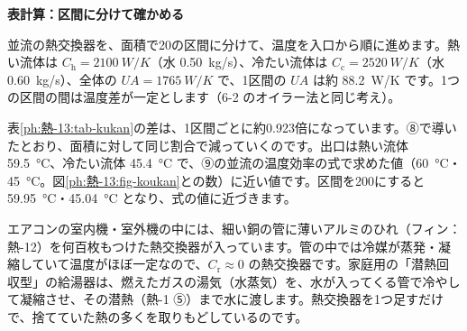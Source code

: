 \noindent\textbf{表計算：区間に分けて確かめる}\par\nobreak
並流の熱交換器を、面積で20の区間に分けて、温度を入口から順に進めます。熱い流体は $C_{\mathrm h}=\qty{2100}{W/K}$（水 \qty{0.50}{kg/s}）、冷たい流体は $C_{\mathrm c}=\qty{2520}{W/K}$（水 \qty{0.60}{kg/s}）、全体の $UA=\qty{1765}{W/K}$ で、1区間の $UA$ は約 \qty{88.2}{W/K} です。1つの区間の間は温度差が一定とします（6-2 のオイラー法と同じ考え）。
\begin{bkcenter}
\label{ph:熱-13:tab-kukan}
\end{bkcenter}
表\ref{ph:熱-13:tab-kukan}の差は、1区間ごとに約0.923倍になっています。⑧で導いたとおり、面積に対して同じ割合で減っていくのです。出口は熱い流体 \qty{59.5}{\celsius}、冷たい流体 \qty{45.4}{\celsius} で、⑨の並流の温度効率の式で求めた値（\qty{60}{\celsius}・\qty{45}{\celsius}。図\ref{ph:熱-13:fig-koukan}との数）に近い値です。区間を200にすると \qty{59.95}{\celsius}・\qty{45.04}{\celsius} となり、式の値に近づきます。

\begin{phmijika}
エアコンの室内機・室外機の中には、細い銅の管に薄いアルミのひれ（フィン：熱-12）を何百枚もつけた熱交換器が入っています。管の中では冷媒が蒸発・凝縮していて温度がほぼ一定なので、$C_{\mathrm r}\approx0$ の熱交換器です。家庭用の「潜熱回収型」の給湯器は、燃えたガスの湯気（水蒸気）を、水が入ってくる管で冷やして凝縮させ、その潜熱（熱-1 ⑤）まで水に渡します。熱交換器を1つ足すだけで、捨てていた熱の多くを取りもどしているのです。
\end{phmijika}


